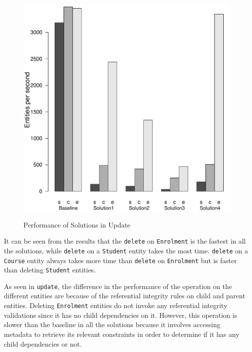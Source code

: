 \begin{figure}[H]
		{\includegraphics[width=\W]{figure/result/barplot-delete-tp.pdf}\label{fres:Delete-throughput}}
		\caption{Performance of Solutions in Update}\label{fres:Delete}
	\end{figure}
 
It can be seen from the results that the \texttt{delete} on \texttt{Enrolment}
is the fastest in all the solutions, while  \texttt{delete} on a
\texttt{Student} entity takes the most time. \texttt{delete} on a
\texttt{Course} entity always takes more time than \texttt{delete} on
\texttt{Enrolment} but is faster than deleting \texttt{Student} entities.

As seen in \texttt{update}, the difference in the performance of the operation
on the different entities are because of the referential integrity rules on
child and parent entities. Deleting \texttt{Enrolment} entities do not invoke
any referential integrity validations since it has no child dependencies on it.
However, this operation is  slower than the baseline in all the solutions
because it involves accessing metadata to retrieve its relevant constraints in
order to determine if it has any child dependencies or not.

